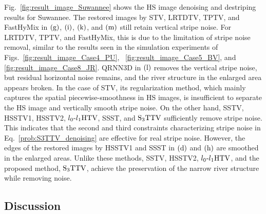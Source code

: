 


Fig.~\ref{fig:result_image_Suwannee} shows the HS image denoising and destriping results for Suwannee.
The restored images by STV, LRTDTV, TPTV, and FastHyMix in $\text{(g)}$, $\text{(i)}$, $\text{(k)}$, and $\text{(m)}$ still retain vertical stripe noise.
For LRTDTV, TPTV, and FastHyMix, this is due to the limitation of stripe noise removal, similar to the results seen in the simulation experiments of Figs.~\ref{fig:result_image_Case4_PU}, ~\ref{fig:result_image_Case5_BV}, and \ref{fig:result_image_Case8_JR}. QRNN3D in $\text{(l)}$ removes the vertical stripe noise, but residual horizontal noise remains, and the river structure in the enlarged area appears broken.
In the case of STV, its regularization method, which mainly captures the spatial piecewise-smoothness in HS images, is insufficient to separate the HS image and vertically smooth stripe noise.
On the other hand, SSTV, HSSTV1, HSSTV2, ${l_{0}\text{-}l_{1}\text{HTV}}$, SSST, and ${\text{S}_{3} \text{TTV}}$ sufficiently remove stripe noise.
This indicates that the second and third constraints characterizing stripe noise in Eq.~\eqref{prob:S3TTV_denoising} are effective for real stripe noise.
However, the edges of the restored images by HSSTV1 and SSST in $\text{(d)}$ and $\text{(h)}$ are smoothed in the enlarged areas.
Unlike these methods, SSTV, HSSTV2, ${l_{0}\text{-}l_{1}\text{HTV}}$, and the proposed method, ${\text{S}_{3} \text{TTV}}$, achieve the preservation of the narrow river structure while removing noise.


\subsection{Discussion}
\label{subsec:Discussion}


